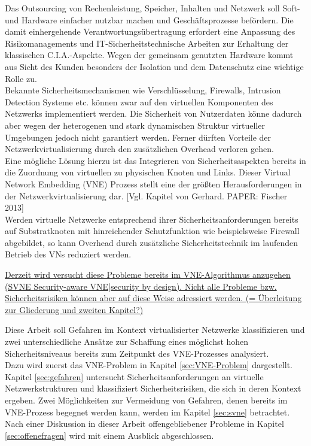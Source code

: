 Das Outsourcing von Rechenleistung, Speicher, Inhalten und Netzwerk soll Soft- und Hardware einfacher nutzbar machen und Geschäftsprozesse befördern. Die damit einhergehende Verantwortungsübertragung erfordert eine Anpassung des Risikomanagements und IT-Sicherheitstechnische Arbeiten zur Erhaltung der klassischen C.I.A.-Aspekte. Wegen der gemeinsam genutzten Hardware kommt aus Sicht des Kunden besonders der Isolation und dem Datenschutz eine wichtige Rolle zu.\\
Bekannte Sicherheitsmechanismen wie Verschlüsselung, Firewalls, Intrusion Detection Systeme etc. können zwar auf den virtuellen Komponenten des Netzwerks implementiert werden. Die Sicherheit von Nutzerdaten könne dadurch aber wegen der heterogenen und stark dynamischen Struktur virtueller Umgebungen jedoch nicht garantiert werden. Ferner dürften Vorteile der Netzwerkvirtualisierung durch den zusätzlichen Overhead verloren gehen. \cite{gong2016virtual}\\
Eine mögliche Lösung hierzu ist das Integrieren von Sicherheitsaspekten bereits in die Zuordnung von virtuellen zu physischen Knoten und Links. Dieser Virtual Network Embedding (VNE) Prozess stellt eine der größten Herausforderungen in der Netzwerkvirtualisierung dar. \cite{fischer2013virtual}[Vgl. Kapitel von Gerhard. PAPER: Fischer 2013] \\
Werden virtuelle Netzwerke entsprechend ihrer Sicherheitsanforderungen bereits auf Substratknoten mit hinreichender Schutzfunktion wie beispielsweise Firewall abgebildet, so kann Overhead durch zusätzliche Sicherheitstechnik im laufenden Betrieb des VNs reduziert werden.

\underline{Derzeit wird versucht \cite{bays2012security, gong2016virtual, wang2016towards} diese Probleme bereits im VNE-Algorithmus anzugehen (SVNE Security-aware VNE|security by design). Nicht alle Probleme bzw. Sicherheitsrisiken können aber auf diese Weise adressiert werden. (= Überleitung zur Gliederung und zweiten Kapitel?)}


Diese Arbeit soll Gefahren im Kontext virtualisierter Netzwerke klassifizieren und zwei unterschiedliche Ansätze zur Schaffung eines möglichst hohen Sicherheitsniveaus bereits zum Zeitpunkt des VNE-Prozesses analysiert.\\
Dazu wird zuerst das VNE-Problem in Kapitel \ref{sec:VNE-Problem} \textit{} dargestellt. Kapitel \ref{sec:gefahren} \textit{} untersucht Sicherheitsanforderungen an virtuelle Netzwerkstrukturen und klassifiziert Sicherheitsrisiken, die sich in deren Kontext ergeben. Zwei Möglichkeiten zur Vermeidung von Gefahren, denen bereits im VNE-Prozess begegnet werden kann, werden im Kapitel \ref{sec:svne} \textit{} betrachtet. Nach einer Diskussion in dieser Arbeit offengebliebener Probleme in Kapitel \ref{sec:offenefragen} \textit{} wird mit einem Ausblick abgeschlossen.

